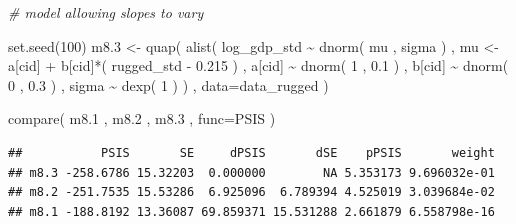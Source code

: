 \documentclass[
]{book}
\newenvironment{Shaded}{\begin{snugshade}}{\end{snugshade}}
\newcommand{\AttributeTok}[1]{\textcolor[rgb]{0.77,0.63,0.00}{#1}}
\newcommand{\CommentTok}[1]{\textcolor[rgb]{0.56,0.35,0.01}{\textit{#1}}}
\newcommand{\DecValTok}[1]{\textcolor[rgb]{0.00,0.00,0.81}{#1}}
\newcommand{\FloatTok}[1]{\textcolor[rgb]{0.00,0.00,0.81}{#1}}
\newcommand{\FunctionTok}[1]{\textcolor[rgb]{0.00,0.00,0.00}{#1}}
\newcommand{\NormalTok}[1]{#1}
\newcommand{\OtherTok}[1]{\textcolor[rgb]{0.56,0.35,0.01}{#1}}
\newcommand{\SpecialCharTok}[1]{\textcolor[rgb]{0.00,0.00,0.00}{#1}}
\begin{document}
\begin{Shaded}
\begin{Highlighting}[]
\CommentTok{\# model allowing slopes to vary}

\FunctionTok{set.seed}\NormalTok{(}\DecValTok{100}\NormalTok{)}
\NormalTok{m8}\FloatTok{.3} \OtherTok{\textless{}{-}} \FunctionTok{quap}\NormalTok{( }\FunctionTok{alist}\NormalTok{(}
\NormalTok{log\_gdp\_std }\SpecialCharTok{\textasciitilde{}} \FunctionTok{dnorm}\NormalTok{( mu , sigma ) , }
\NormalTok{mu }\OtherTok{\textless{}{-}}\NormalTok{ a[cid] }\SpecialCharTok{+}\NormalTok{ b[cid]}\SpecialCharTok{*}\NormalTok{( rugged\_std }\SpecialCharTok{{-}} \FloatTok{0.215}\NormalTok{ ) , }
\NormalTok{a[cid] }\SpecialCharTok{\textasciitilde{}} \FunctionTok{dnorm}\NormalTok{( }\DecValTok{1}\NormalTok{ , }\FloatTok{0.1}\NormalTok{ ) , }
\NormalTok{b[cid] }\SpecialCharTok{\textasciitilde{}} \FunctionTok{dnorm}\NormalTok{( }\DecValTok{0}\NormalTok{ , }\FloatTok{0.3}\NormalTok{ ) , }
\NormalTok{sigma }\SpecialCharTok{\textasciitilde{}} \FunctionTok{dexp}\NormalTok{( }\DecValTok{1}\NormalTok{ )}
\NormalTok{) , }\AttributeTok{data=}\NormalTok{data\_rugged )  }
 
\FunctionTok{compare}\NormalTok{( m8}\FloatTok{.1}\NormalTok{ , m8}\FloatTok{.2}\NormalTok{ , m8}\FloatTok{.3}\NormalTok{ , }\AttributeTok{func=}\NormalTok{PSIS )}
\end{Highlighting}
\end{Shaded}

\begin{verbatim}
##           PSIS       SE     dPSIS       dSE    pPSIS       weight
## m8.3 -258.6786 15.32203  0.000000        NA 5.353173 9.696032e-01
## m8.2 -251.7535 15.53286  6.925096  6.789394 4.525019 3.039684e-02
## m8.1 -188.8192 13.36087 69.859371 15.531288 2.661879 6.558798e-16
\end{verbatim}
\end{document}
